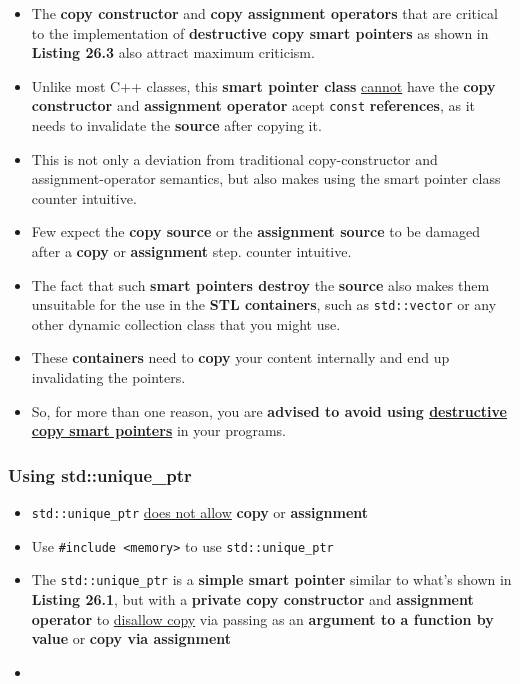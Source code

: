 \documentclass[10pt]{article}
\newcommand{\pbreak}{\vspace{30pt}}
\begin{document}
\begin{tcolorbox}
	\begin{itemize}
		\item The \textbf{copy constructor} and \textbf{copy assignment operators} that are critical to the implementation of \textbf{destructive copy smart pointers} as shown in \textbf{Listing 26.3} also attract maximum criticism.

		\item Unlike most C++ classes, this \textbf{smart pointer class} \underline{cannot} have the \textbf{copy constructor} and \textbf{assignment operator} acept \verb|const| \textbf{references}, as it needs to invalidate the \textbf{source} after copying it.

		\item This is not only a deviation from traditional copy-constructor and assignment-operator semantics, but also makes using the smart pointer class counter intuitive.

		\item Few expect the \textbf{copy source} or the \textbf{assignment source} to be damaged after a \textbf{copy} or \textbf{assignment} step. counter intuitive.

		\pbreak
		
	\item The fact that such \textbf{smart pointers destroy} the \textbf{source} also makes them unsuitable for the use in the \textbf{STL containers}, such as \verb|std::vector| or any other dynamic collection class that you might use.

	\item These \textbf{containers} need to \textbf{copy} your content internally and end up invalidating the pointers.

		\pbreak

	\item So, for more than one reason, you are \textbf{advised to avoid using \underline{destructive copy smart pointers}} in your programs.
	\end{itemize}
\end{tcolorbox}

\newpage
\subsubsection{Using std::unique\_ptr}
\begin{itemize}
	\item \verb|std::unique_ptr| \underline{does not allow} \textbf{copy} or \textbf{assignment}
	\item Use \verb|#include <memory>| to use \verb|std::unique_ptr|

\item The \verb|std::unique_ptr| is a \textbf{simple smart pointer} similar to what's shown in \textbf{Listing 26.1}, but with a \textbf{private copy constructor} and \textbf{assignment operator} to \underline{disallow copy} via passing as an \textbf{argument to a function by value} or \textbf{copy via assignment}

\item {}
\end{itemize}
\end{document}
